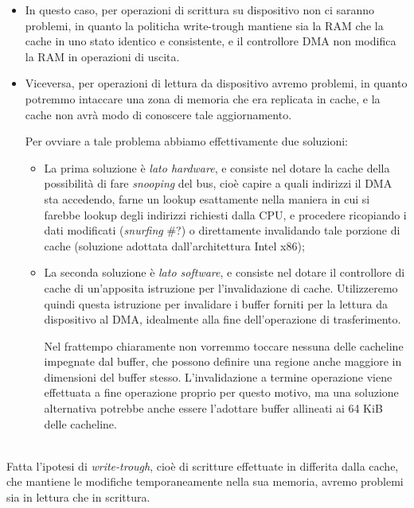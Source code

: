 \documentclass[a4paper,11pt]{article}
\begin{document}
\begin{itemize}
	\item 
		In questo caso, per operazioni di scrittura su dispositivo non ci saranno problemi, in quanto la politicha write-trough mantiene sia la RAM che la cache in uno stato identico e consistente, e il controllore DMA non modifica la RAM in operazioni di uscita.
	\item
		Viceversa, per operazioni di lettura da dispositivo avremo problemi, in quanto potremmo intaccare una zona di memoria che era replicata in cache, e la cache non avrà modo di conoscere tale aggiornamento.

		Per ovviare a tale problema abbiamo effettivamente due soluzioni:
		\begin{itemize}
			\item La prima soluzione è \textit{lato hardware}, e consiste nel dotare la cache della possibilità di fare \textit{snooping} del bus, cioè capire a quali indirizzi il DMA sta accedendo, farne un lookup esattamente nella maniera in cui si farebbe lookup degli indirizzi richiesti dalla CPU, e procedere ricopiando i dati modificati (\textit{snurfing} #?) o direttamente invalidando tale porzione di cache (soluzione adottata dall'architettura Intel x86);
			\item La seconda soluzione è \textit{lato software}, e consiste nel dotare il controllore di cache di un'apposita istruzione per l'invalidazione di cache.
				Utilizzeremo quindi questa istruzione per invalidare i buffer forniti per la lettura da dispositivo al DMA, idealmente alla fine dell'operazione di trasferimento.

				Nel frattempo chiaramente non vorremmo toccare nessuna delle cacheline impegnate dal buffer, che possono definire una regione anche maggiore in dimensioni del buffer stesso.
				L'invalidazione a termine operazione viene effettuata a fine operazione proprio per questo motivo, ma una soluzione alternativa potrebbe anche essere l'adottare buffer allineati ai 64 KiB delle cacheline.
		\end{itemize}
\end{itemize}

\par\smallskip
\noindent
\textbf{} \\
Fatta l'ipotesi di \textit{write-trough}, cioè di scritture effettuate in differita dalla cache, che mantiene le modifiche temporaneamente nella sua memoria, avremo problemi sia in lettura che in scrittura.
\end{document}
